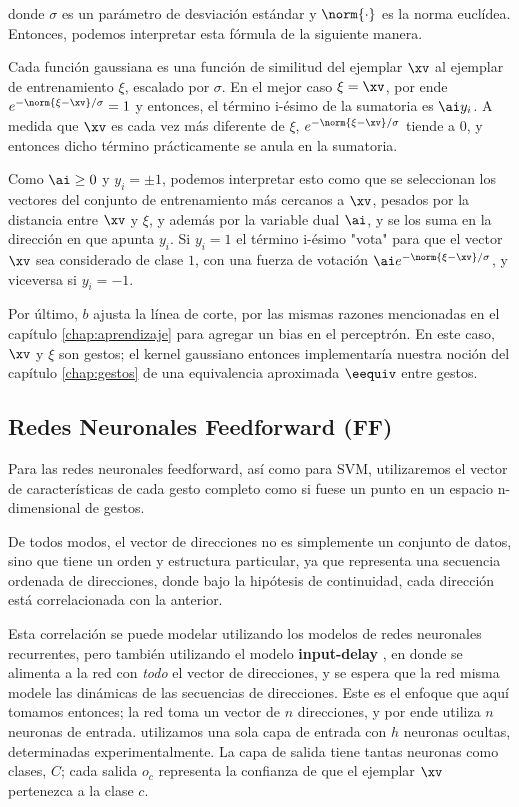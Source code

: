 
donde $\sigma$ es un parámetro de desviación estándar y $\norm{\cdot}$ es la norma euclídea. Entonces, podemos interpretar esta fórmula de la siguiente manera. 

Cada función gaussiana es una función de similitud del ejemplar $\xv$ al ejemplar de entrenamiento $\xi$, escalado por $\sigma$. En el mejor caso $\xi=\xv$, por ende $e^{-\norm{\xi-\xv}/\sigma}=1$ y entonces, el término i-ésimo de la sumatoria es $\ai y_i$. A medida que $\xv$ es cada vez más diferente de $\xi$, $e^{-\norm{\xi-\xv}/\sigma}$ tiende a 0, y entonces dicho término prácticamente se anula en la sumatoria.  

Como $\ai\geq 0 $ y $y_i= \pm 1$, podemos interpretar esto como que se seleccionan los vectores del conjunto de entrenamiento más cercanos a $\xv$, pesados por la distancia entre $\xv$ y $\xi$, y además por la variable dual $\ai$, y se los suma en la dirección en que apunta $y_i$. Si $y_i=1$ el término i-ésimo "vota" para que el vector $\xv$ sea considerado de clase $1$, con una fuerza de votación $\ai  e^{-\norm{\xi-\xv}/\sigma}$, y viceversa si $y_i=-1$. 

Por último, $b$ ajusta la línea de corte, por las mismas razones mencionadas en el capítulo \ref{chap:aprendizaje} para agregar un bias en el perceptrón. En este caso, $\xv$ y $\xi$ son gestos; el kernel gaussiano entonces implementaría nuestra noción del capítulo \ref{chap:gestos} de una equivalencia aproximada $\eequiv$ entre gestos.

\subsection{Redes Neuronales Feedforward (FF)}

Para las redes neuronales feedforward, así como para SVM, utilizaremos el vector de características de cada gesto completo como si fuese un punto en un espacio n-dimensional de gestos.

De todos modos, el vector de direcciones no es simplemente un conjunto de datos, sino que tiene un orden y estructura particular, ya que representa una secuencia ordenada de direcciones, donde bajo la hipótesis de continuidad, cada dirección está correlacionada con la anterior. 

Esta correlación se puede modelar utilizando los modelos de redes neuronales recurrentes, pero también utilizando el modelo \textbf{input-delay} \cite{Haykin1998}, en donde se alimenta a la red con \textit{todo} el vector de direcciones, y se espera que la red misma modele las dinámicas de las secuencias de direcciones. Este es el enfoque que aquí tomamos entonces; la red toma un vector de $n$ direcciones, y por ende utiliza $n$ neuronas de entrada. utilizamos una sola capa de entrada con $h$ neuronas ocultas, determinadas experimentalmente. La capa de salida tiene tantas neuronas como clases, $C$; cada salida $o_c$ representa la confianza de que el ejemplar $\xv$ pertenezca a la clase $c$.
 

